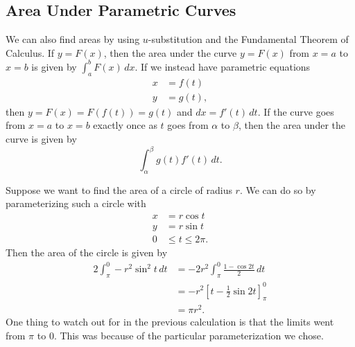 \documentclass[10pt,]{book}
\theoremstyle{ptxplainnotitle}
\theoremstyle{ptxplaintitle}
\theoremstyle{ptxplainnotitle}
\theoremstyle{ptxplaintitle}
\theoremstyle{ptxplainnotitle}
\theoremstyle{ptxplaintitle}
\theoremstyle{ptxdefinitionnotitle}
\theoremstyle{ptxdefinitiontitle}
\theoremstyle{ptxdefinitionnotitle}
\theoremstyle{ptxdefinitiontitle}
\theoremstyle{ptxdefinitionnotitle}
\theoremstyle{ptxdefinitiontitle}
\theoremstyle{ptxdefinitionnotitle}
\theoremstyle{ptxdefinitiontitle}
\theoremstyle{ptxdefinitionnotitle}
\theoremstyle{ptxdefinitiontitle}
\numberwithin{equation}{section}
\begin{document}
\subsection[{Area Under Parametric Curves}]{Area Under Parametric Curves}\label{subsection-area-under-parametric-curves}
\hypertarget{p-662}{}%
We can also find areas by using \(u\)-substitution and the Fundamental Theorem of Calculus. If \(y = F(x)\), then the area under the curve \(y=F(x)\) from \(x=a\) to \(x=b\) is given by \(\int_{a}^{b} F(x)\,dx\). If we instead have parametric equations%
%
\begin{align*}
x & = f(t) \\
y & = g(t), 
\end{align*}
\hypertarget{p-663}{}%
then \(y = F(x) = F(f(t)) = g(t)\) and \(dx = f'(t)\,dt\). If the curve goes from \(x=a\) to \(x=b\) exactly once as \(t\) goes from \(\alpha\) to \(\beta\), then the area under the curve is given by%
%
\begin{equation*}
\int_{\alpha}^{\beta}g(t)f'(t)\,dt.
\end{equation*}
\begin{example}\label{example-area-of-a-circle}
\hypertarget{p-664}{}%
Suppose we want to find the area of a circle of radius \(r\). We can do so by parameterizing such a circle with%
%
\begin{align*}
x & = r\cos t \\
y & = r\sin t \\
0 & \leq t\leq 2\pi. 
\end{align*}
\hypertarget{p-665}{}%
Then the area of the circle is given by%
%
\begin{align*}
2\int_{\pi}^{0} -r^{2}\sin^{2}t\,dt &= -2r^{2}\int_{\pi}^{0}\frac{1-\cos2t}{2}\,dt\\
& = -r^{2}\left[t-\frac{1}{2}\sin2t\right]_{\pi}^{0} \\
& = \pi r^{2}.
\end{align*}
\hypertarget{p-666}{}%
One thing to watch out for in the previous calculation is that the limits went from \(\pi\) to \(0\). This was because of the particular parameterization we chose.%
\end{example}
\typeout{************************************************}
\typeout{************************************************}
\end{document}
